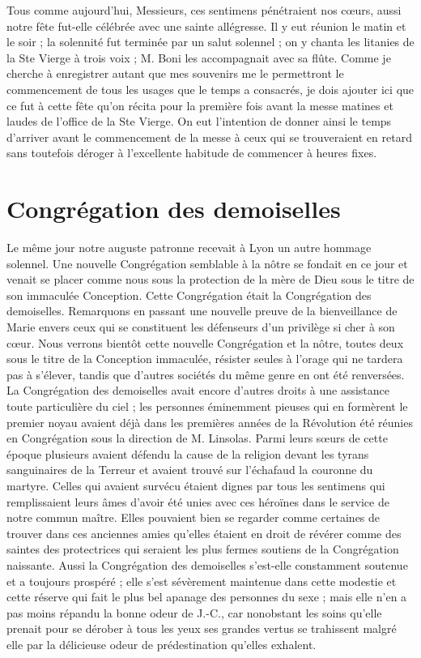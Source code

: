 Tous comme aujourd'hui, Messieurs, ces sentimens pénétraient nos cœurs, aussi notre fête fut-elle célébrée avec une sainte allégresse. Il y eut réunion le matin et le soir ; la solennité fut terminée par un salut solennel ; on y chanta les litanies de la Ste Vierge à trois voix ; M. Boni les accompagnait avec sa flûte. Comme je cherche à enregistrer autant que mes souvenirs me le permettront le commencement de tous les usages que le temps a consacrés, je dois ajouter ici que ce fut à cette fête qu'on récita pour la première fois avant la messe matines et laudes de l'office de la Ste Vierge. On eut l'intention de donner ainsi le temps d'arriver avant le commencement de la messe à ceux qui se trouveraient en retard sans toutefois déroger à l'excellente habitude de commencer à heures fixes.

\section*{Congrégation des demoiselles}
Le même jour notre auguste patronne recevait à Lyon un autre hommage solennel. Une nouvelle Congrégation semblable à la nôtre se fondait en ce jour et venait se placer comme nous sous la protection de la mère de Dieu sous le titre de son immaculée Conception. Cette Congrégation était la Congrégation des demoiselles. Remarquons en passant une nouvelle preuve de la bienveillance de Marie envers ceux qui se constituent les défenseurs d'un privilège si cher à son cœur. Nous verrons bientôt cette nouvelle Congrégation et la nôtre, toutes deux sous le titre de la Conception immaculée, résister seules à l'orage qui ne tardera pas à s'élever,
tandis que d'autres sociétés du même genre en ont été renversées. La Congrégation des demoiselles avait encore d'autres droits à une assistance toute particulière du ciel ; les personnes éminemment pieuses qui en formèrent le premier noyau avaient déjà dans les premières années de la Révolution été réunies en Congrégation sous la direction de M. Linsolas. Parmi leurs sœurs de cette époque plusieurs avaient défendu la cause de la religion devant les tyrans sanguinaires de la Terreur et avaient trouvé sur l'échafaud la couronne du martyre. Celles qui avaient survécu étaient dignes par tous les sentimens qui remplissaient leurs âmes d'avoir été unies avec ces héroïnes dans le service de notre commun maître. Elles pouvaient bien se regarder comme certaines de trouver dans ces anciennes amies qu'elles étaient en droit de révérer comme des saintes des protectrices qui seraient les plus fermes soutiens de la Congrégation naissante. Aussi la Congrégation des demoiselles s'est-elle constamment soutenue et a toujours prospéré ; elle s'est sévèrement maintenue dans cette modestie et cette réserve qui fait le plus bel apanage des personnes du sexe ; mais elle n'en a pas moins répandu la bonne odeur de J.-C., car nonobstant les soins qu'elle prenait pour se dérober à tous les yeux ses grandes vertus se trahissent malgré elle par la délicieuse odeur de prédestination qu'elles exhalent.

